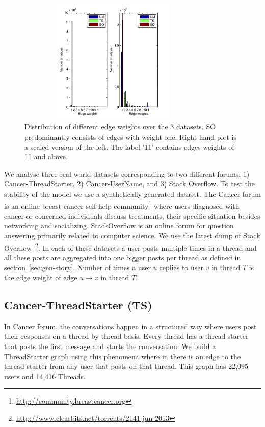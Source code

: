 \documentclass{sig-alternate}
\newcommand{\comment}[1]{\textcolor{red}{[#1]}}
\begin{document}
\begin{figure}
\begin{center}
\includegraphics[height=6cm,width=9cm]{EdgeDistribution.pdf}
\end{center}
\caption{Distribution of different edge weights over the 3 datasets. SO 
predominantly consists of edges with weight one. Right hand plot is a scaled
version of the left. The label '11' contains edges weights of 11 and above.}
\label{fig:EdgeDistribution}
\end{figure}

We analyse three real world datasets corresponding to two different forums: 1)
Cancer-ThreadStarter, 2) Cancer-UserName, and 3) Stack Overflow. To test the
stability of the model we use a synthetically generated dataset. 
The Cancer forum is an online breast cancer self-help
community\footnote{\url{http://community.breastcancer.org}} where users
diagnosed with cancer or concerned individuals discuss treatments, their
specific situation besides networking and socializing. StackOverflow is an
online forum for question answering primarily related to computer science. We
use the latest dump of Stack
Overflow~\footnote{\url{http://www.clearbits.net/torrents/2141-jun-2013}}. In
each of these datasets a user posts multiple times in a thread and all these
posts are aggregated into one bigger posts per thread as defined in
section~\ref{sec:gen-story}.
Number of times a user $u$ replies to user $v$ in thread $T$ is the edge weight
of edge $u\rightarrow v$ in thread $T$.

\subsection{Cancer-ThreadStarter (TS)}
In Cancer forum, the conversations happen
in a structured way where users post their responses on a thread by thread
basis. Every thread has a thread starter that posts the first message and
starts the conversation. We build a ThreadStarter graph using this phenomena
where in there is an edge to the thread starter from any user that posts on that
thread. This graph has 22,095 users and 14,416 Threads. 
\end{document}
